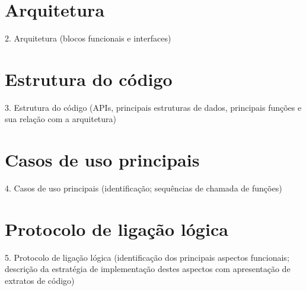 \documentclass[article, a4paper, 11pt, oneside]{memoir}
\begin{document}
\chapter[Arquitetura][Arquitetura]{Arquitetura} \label{\thechapter}

2. Arquitetura
  (blocos funcionais e interfaces)

\newpage
\chapter[Estrutura do código][Estrutura do código]{Estrutura do código} \label{\thechapter}

3. Estrutura do código
  (APIs, principais estruturas de dados, principais funções e sua relação com a arquitetura)

\newpage
\chapter[Casos de uso principais][Casos de uso principais]{Casos de uso principais} \label{\thechapter}


4. Casos de uso principais
  (identificação; sequências de chamada de funções)

\newpage
\chapter[Protocolo de ligação lógica][Protocolo de ligação lógica]{Protocolo de ligação lógica} \label{\thechapter}

5. Protocolo de ligação lógica
  (identificação dos principais aspectos funcionais; descrição da estratégia de implementação destes aspectos com apresentação de extratos de código)

\newpage
\end{document}
